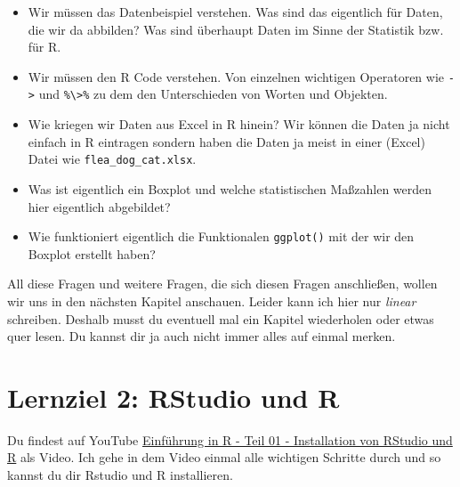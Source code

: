 \documentclass[
  letterpaper,
]{scrbook}
\providecommand{\tightlist}{%
  \setlength{\itemsep}{0pt}\setlength{\parskip}{0pt}}\usepackage{longtable,booktabs,array}
\begin{document}
\begin{itemize}
\tightlist
\item
  Wir müssen das Datenbeispiel verstehen. Was sind das eigentlich für
  Daten, die wir da abbilden? Was sind überhaupt Daten im Sinne der
  Statistik bzw. für R.
\item
  Wir müssen den R Code verstehen. Von einzelnen wichtigen Operatoren
  wie \texttt{-\textgreater{}} und
  \texttt{\%\textbackslash{}\textgreater{}\%} zu dem den Unterschieden
  von Worten und Objekten.
\item
  Wie kriegen wir Daten aus Excel in R hinein? Wir können die Daten ja
  nicht einfach in R eintragen sondern haben die Daten ja meist in einer
  (Excel) Datei wie \texttt{flea\_dog\_cat.xlsx}.
\item
  Was ist eigentlich ein Boxplot und welche statistischen Maßzahlen
  werden hier eigentlich abgebildet?
\item
  Wie funktioniert eigentlich die Funktionalen \texttt{ggplot()} mit der
  wir den Boxplot erstellt haben?
\end{itemize}

All diese Fragen und weitere Fragen, die sich diesen Fragen anschließen,
wollen wir uns in den nächsten Kapitel anschauen. Leider kann ich hier
nur \emph{linear} schreiben. Deshalb musst du eventuell mal ein Kapitel
wiederholen oder etwas quer lesen. Du kannst dir ja auch nicht immer
alles auf einmal merken.

\hypertarget{lernziel-2-rstudio-und-r}{%
\section{Lernziel 2: RStudio und R}\label{lernziel-2-rstudio-und-r}}

\begin{tcolorbox}[enhanced jigsaw, coltitle=black, titlerule=0mm, bottomrule=.15mm, opacityback=0, opacitybacktitle=0.6, leftrule=.75mm, title=\textcolor{quarto-callout-tip-color}{\faLightbulb}\hspace{0.5em}{Was ist eigentlich RStudio und woher kriege ich das?}, toprule=.15mm, bottomtitle=1mm, toptitle=1mm, left=2mm, breakable, arc=.35mm, colback=white, rightrule=.15mm, colbacktitle=quarto-callout-tip-color!10!white, colframe=quarto-callout-tip-color-frame]
Du findest auf YouTube \href{https://youtu.be/krF7TJVb-UA}{Einführung in
R - Teil 01 - Installation von RStudio und R} als Video. Ich gehe in dem
Video einmal alle wichtigen Schritte durch und so kannst du dir Rstudio
und R installieren.
\end{tcolorbox}
\end{document}
